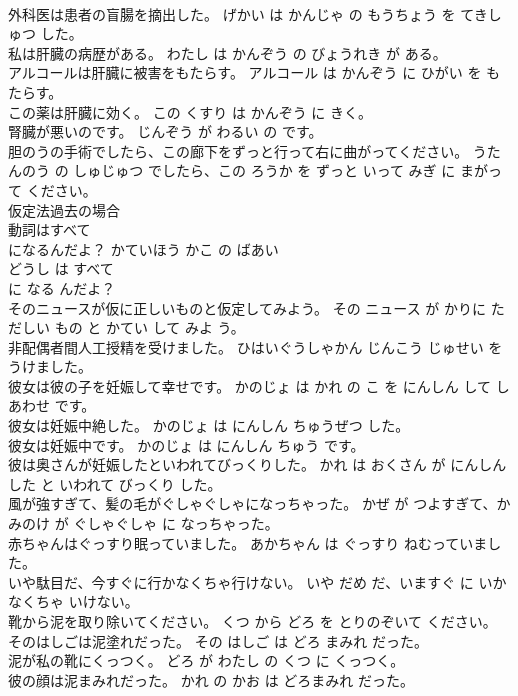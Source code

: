 \documentclass[8pt]{extreport}
\begin{document}
\begin{CJK}{UTF8}{min}
\\	外科医は患者の盲腸を摘出した。	げかい は かんじゃ の もうちょう を てきしゅつ した。	
\\	私は肝臓の病歴がある。	わたし は かんぞう の びょうれき が ある。	
\\	アルコールは肝臓に被害をもたらす。	アルコール は かんぞう に ひがい を もたらす。	
\\	この薬は肝臓に効く。	この くすり は かんぞう に きく。	
\\	腎臓が悪いのです。	じんぞう が わるい の です。	
\\	胆のうの手術でしたら、この廊下をずっと行って右に曲がってください。	うたんのう の しゅじゅつ でしたら、この ろうか を ずっと いって みぎ に まがって ください。	
\\	仮定法過去の場合
\\	動詞はすべて
\\	になるんだよ？	かていほう かこ の ばあい 
\\	どうし は すべて 
\\	に なる んだよ？	
\\	そのニュースが仮に正しいものと仮定してみよう。	その ニュース が かりに ただしい もの と かてい して みよ う。	
\\	非配偶者間人工授精を受けました。	ひはいぐうしゃかん じんこう じゅせい を うけました。	
\\	彼女は彼の子を妊娠して幸せです。	かのじょ は かれ の こ を にんしん して しあわせ です。	
\\	彼女は妊娠中絶した。	かのじょ は にんしん ちゅうぜつ した。	
\\	彼女は妊娠中です。	かのじょ は にんしん ちゅう です。	
\\	彼は奥さんが妊娠したといわれてびっくりした。	かれ は おくさん が にんしん した と いわれて びっくり した。	
\\	風が強すぎて、髪の毛がぐしゃぐしゃになっちゃった。	かぜ が つよすぎて、かみのけ が ぐしゃぐしゃ に なっちゃった。	
\\	赤ちゃんはぐっすり眠っていました。	あかちゃん は ぐっすり ねむっていました。	
\\	いや駄目だ、今すぐに行かなくちゃ行けない。	いや だめ だ、いますぐ に いかなくちゃ いけない。	
\\	靴から泥を取り除いてください。	くつ から どろ を とりのぞいて ください。	
\\	そのはしごは泥塗れだった。	その はしご は どろ まみれ だった。	
\\	泥が私の靴にくっつく。	どろ が わたし の くつ に くっつく。	
\\	彼の顔は泥まみれだった。	かれ の かお は どろまみれ だった。	

\end{CJK}
\end{document}
